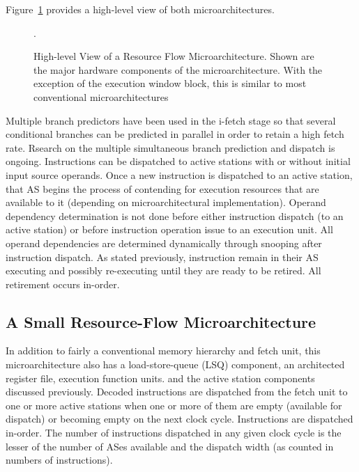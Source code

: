 \documentclass{book}
\begin{document}
Figure~\ref{fig:high} provides a high-level view of 
both microarchitectures.
%
\begin{figure}
\centerline{}
\caption[High-level View of a Resource Flow Microarchitecture]
{{High-level View of a Resource Flow Microarchitecture.} 
Shown are the major hardware components of the microarchitecture.
With the exception of the 
execution window block, this is similar to most conventional
microarchitectures}.
\label{fig:high}
\end{figure}
%
Multiple branch predictors have been used in the i-fetch stage
so that several conditional branches can be predicted in parallel
in order to retain a high fetch rate.
Rsearch on the multiple simultaneous branch prediction and
dispatch is ongoing.
Instructions can be dispatched to
active stations with or without initial input source operands.
Once a new instruction is dispatched to an active station,
that AS begins the process of contending for
execution resources that are available to it (depending on
microarchitectural implementation).
Operand dependency determination is not done before
either instruction dispatch (to an active station) or
before instruction operation issue to an execution unit.
All operand dependencies are determined dynamically through
snooping after instruction dispatch.
As stated previously, instruction remain in their AS executing
and possibly re-executing until they are ready to be retired.
All retirement occurs in-order.
%
%
\subsection{A Small Resource-Flow Microarchitecture}
%
In addition to fairly a conventional memory hierarchy and
fetch unit, this microarchitecture also has a
load-store-queue (LSQ) component, an architected register file,
execution function units.
and the active station components discussed previously.
Decoded instructions are dispatched from the 
fetch unit to one or more active stations
when one or more of them are empty (available for dispatch) or 
becoming empty on the next clock cycle.  
Instructions are dispatched in-order.
The number of instructions dispatched in any 
given clock cycle is
the lesser of the number of ASes available and the
dispatch width (as counted in numbers of instructions).
\end{document}
